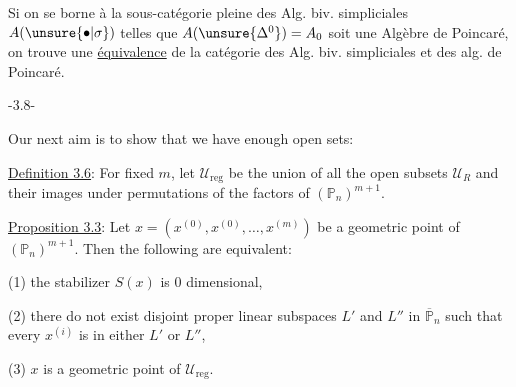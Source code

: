 Si  on se borne à la sous-catégorie pleine des Alg. biv. simpliciales $A(\unsure{\bullet|\sigma})$ telles que $A(\unsure{\Delta^0})=A_0$ soit une Algèbre de Poincaré, on trouve une \uline{équivalence} de la catégorie des Alg. biv. simpliciales et des alg. de Poincaré.
\begin{center}-3.8-\end{center}
Our next aim is to show that we have enough open sets:

\uline{Definition 3.6}: For fixed $m$, let $\mathcal U_{\mathrm{reg}}$ be the union of all the open subsets $\mathcal U_R$ and their images under permutations of the factors of $(\mathbb{P}_n)^{m+1}$.

\uline{Proposition 3.3}: Let $x=(x^{(0)},x^{(0)},\ldots,x^{(m)})$ be a geometric point of $(\mathbb{P}_n)^{m+1}$. Then the following are equivalent:

(1) the stabilizer $S(x)$ is $0$ dimensional,

(2) there do not exist disjoint proper linear subspaces $L'$ and $L''$ in $\overline{\mathbb{P}}_n$ such that every $x^{(i)}$ is in either $L'$ or $L''$,

(3) $x$ is a geometric point of $\mathcal U_{\mathrm{reg}}$.

